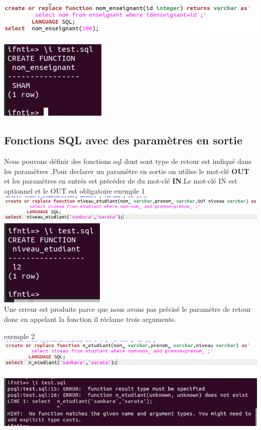 \documentclass[12pt,b5paper]{article}
\begin{document}
\includegraphics[scale=0.6]{nom_}\\
\begin{center}
\includegraphics[scale=0.6]{ensei}\\

\end{center}
\subsection{Fonctions SQL avec des paramètres en sortie}
Nous pouvons définir des fonctions sql dont sont type de retour  est indiqué dans les paramètres .Pour declarer un paramètre en sortie on utilise le mot-clé \textbf{OUT}  et les paramètres en entrés est précéder de du mot-clé \textbf{IN}.Le mot-clé IN est optionnel et le OUT est obligatoire
exemple 1\\
\newpage
\includegraphics[scale=0.5]{out}\\

\includegraphics[scale=0.6]{out1}\\
Une erreur est produite parce que nous avons pas précisé le paramètre de retour donc en appelant la fonction il réclame trois arguments.

exemple 2\\
\includegraphics[scale=0.6]{out2}\\
\includegraphics[scale=0.6]{out3}\\
\end{document}
